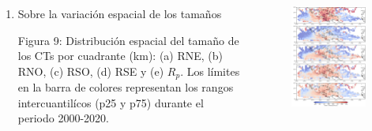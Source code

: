 \begin{frame}
    \begin{columns}
        \begin{column}{0.4\textwidth}
            \begin{enumerate}
                \setcounter{enumi}{0}
                \item Sobre la variación espacial de los tamaños
            \begin{block}{Figura 9:}
                Distribución espacial del tamaño de los CTs por cuadrante (km): (a) RNE, (b) RNO, (c) RSO, (d) RSE y (e) $R_p$. Los límites en la barra de colores representan los rangos intercuantilícos (p25 y p75) durante el periodo 2000-2020.
            \end{block}
            \end{enumerate}
        \end{column}
        \begin{column}{0.6\textwidth}
        \begin{figure}
            \centering
            \includegraphics[scale = 0.17]{Images/Figures/Fig_3_6.jpeg}
            \caption{}
            \label{fig:fig_tamaño}
        \end{figure}
        \end{column}
    \end{columns}
\end{frame}

